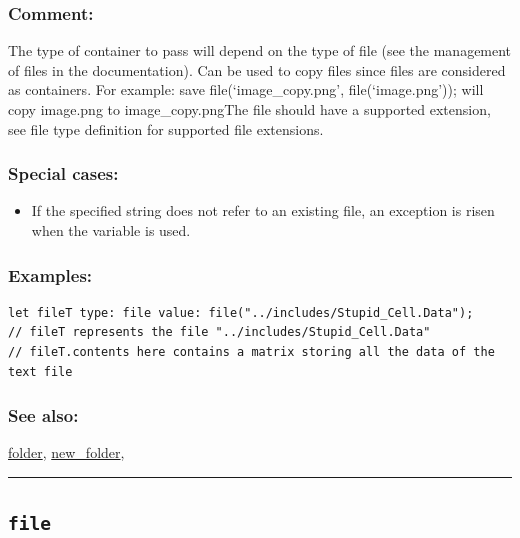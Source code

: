 \documentclass[]{book}
\providecommand{\tightlist}{%
  \setlength{\itemsep}{0pt}\setlength{\parskip}{0pt}}
\theoremstyle{definition}
\theoremstyle{definition}
\theoremstyle{definition}
\theoremstyle{remark}
\begin{document}
\subsubsection{Comment:}\label{comment-36}

The type of container to pass will depend on the type of file (see the
management of files in the documentation). Can be used to copy files
since files are considered as containers. For example: save
file(`image\_copy.png', file(`image.png')); will copy image.png to
image\_copy.pngThe file should have a supported extension, see file type
definition for supported file extensions.

\subsubsection{Special cases:}\label{special-cases-60}

\begin{itemize}
\tightlist
\item
  If the specified string does not refer to an existing file, an
  exception is risen when the variable is used.
\end{itemize}

\subsubsection{Examples:}\label{examples-123}

\begin{verbatim}
let fileT type: file value: file("../includes/Stupid_Cell.Data");           // fileT represents the file "../includes/Stupid_Cell.Data"             // fileT.contents here contains a matrix storing all the data of the text file 
\end{verbatim}

\subsubsection{See also:}\label{see-also-93}

\href{operators-d-to-h.html\#folder}{folder},
\href{operators-n-to-r.html\#new_folder}{new\_folder},

\begin{center}\rule{0.5\linewidth}{\linethickness}\end{center}

\subsection{\texorpdfstring{\texttt{file}}{file}}\label{file-1}
\end{document}
